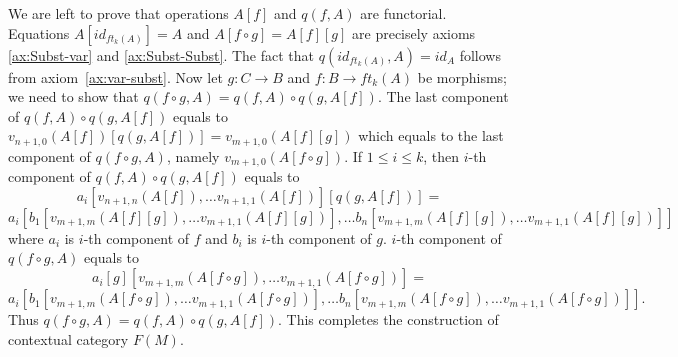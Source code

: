 \documentclass[reqno]{amsart}
\theoremstyle{definition}
\theoremstyle{remark}
\numberwithin{figure}{section}
\begin{document}
We are left to prove that operations $A[f]$ and $q(f,A)$ are functorial.
Equations $A[id_{ft_k(A)}] = A$ and $A[f \circ g] = A[f][g]$ are precisely axioms \eqref{ax:Subst-var} and \eqref{ax:Subst-Subst}.
The fact that $q(id_{ft_k(A)}, A) = id_A$ follows from axiom~\ref{ax:var-subst}.
Now let $g : C \to B$ and $f : B \to ft_k(A)$ be morphisms; we need to show that $q(f \circ g, A) = q(f,A) \circ q(g,A[f])$.
The last component of $q(f,A) \circ q(g,A[f])$ equals to $v_{n+1,0}(A[f])[q(g,A[f])] = v_{m+1,0}(A[f][g])$ which equals to the last component of $q(f \circ g, A)$, namely $v_{m+1,0}(A[f \circ g])$.
If $1 \leq i \leq k$, then $i$-th component of $q(f,A) \circ q(g,A[f])$ equals to
\[ a_i[v_{n+1,n}(A[f]), \ldots v_{n+1,1}(A[f])][q(g,A[f])] = \]
\[ a_i[b_1[v_{m+1,m}(A[f][g]), \ldots v_{m+1,1}(A[f][g])], \ldots b_n[v_{m+1,m}(A[f][g]), \ldots v_{m+1,1}(A[f][g])]] \]
where $a_i$ is $i$-th component of $f$ and $b_i$ is $i$-th component of $g$.
$i$-th component of $q(f \circ g, A)$ equals to
\[ a_i[g][v_{m+1,m}(A[f \circ g]), \ldots v_{m+1,1}(A[f \circ g])] = \]
\[ a_i[b_1[v_{m+1,m}(A[f \circ g]), \ldots v_{m+1,1}(A[f \circ g])], \ldots b_n[v_{m+1,m}(A[f \circ g]), \ldots v_{m+1,1}(A[f \circ g])]]. \]
Thus $q(f \circ g, A) = q(f,A) \circ q(g,A[f])$.
This completes the construction of contextual category $F(M)$.
\end{document}
